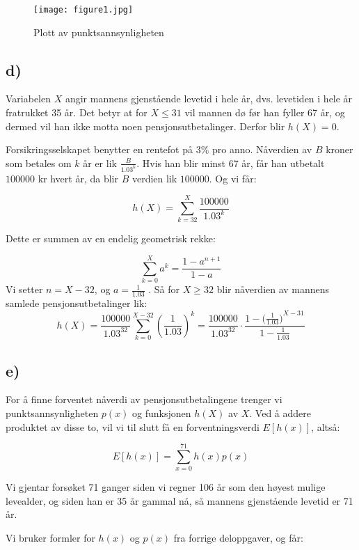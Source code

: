 \documentclass[a4paper, 12pt]{article}
\begin{document}
\begin{figure}[h]
    \centering
    \texttt{[image: figure1.jpg]}
    \caption{Plott av punktsannsynligheten}
    \label{fig:enter-label}
\end{figure}

\subsection*{d)}
\begin{FlushLeft}
Variabelen \(X\) angir mannens gjenstående levetid i hele år, dvs. levetiden i hele år fratrukket 35 år. Det betyr at for \(X \leq 31\) vil mannen dø før han fyller 67 år, og
dermed vil han ikke motta noen pensjonsutbetalinger. Derfor blir \(h(X)=0\).
\end{FlushLeft}
\begin{FlushLeft}
Forsikringsselskapet benytter en rentefot på \(3\%\) pro anno. Nåverdien av \(B\) kroner som betales om \(k\) år er lik \(\frac{B}{{1.03}^{k}}\). Hvis han blir minst 67 år, får han utbetalt \(100000\) kr hvert år, da blir \(B\) verdien lik \(100000\). Og vi får:
\end{FlushLeft}
\[
h(X) = \sum_{k=32}^{X} \frac{100000}{{1.03}^{k}}
\]
\begin{FlushLeft}
Dette er summen av en endelig geometrisk rekke:
\end{FlushLeft}
\[
\sum_{k=0}^{X} a^{k} = \frac{1-{a}^{n+1}}{1-a}
\]
Vi setter \(n=X-32\), og \(a= \frac{1}{1.03}\)
. Så for \(X \geq 32\) blir nåverdien av mannens samlede
pensjonsutbetalinger lik:
\[
h(X) = \frac{100000}{{1.03}^{32}} \sum_{k=0}^{X-32} (\frac{1}{1.03})^{k} = \frac{100000}{{1.03}^{32}} \cdot \frac{1-({\frac{1}{1.03})}^{X-31}}{1-{\frac{1}{1.03}}}
\]

\subsection*{e)}
\begin{FlushLeft}
For å finne forventet nåverdi av pensjonsutbetalingene trenger vi punktsannsynligheten \( p(x) \) og funksjonen \( h(X) \) av \( X \). Ved å addere produktet av disse to, vil vi til slutt få en forventningsverdi \( E[h(x)] \), altså:
\end{FlushLeft}
\[
E[h(x)] = \sum_{x=0}^{71} h(x)p(x)
\]
\begin{FlushLeft}
Vi gjentar forsøket 71 ganger siden vi regner 106 år som den høyest mulige levealder, og siden han er 35 år gammal nå, så mannens gjenstående levetid er 71 år.
\end{FlushLeft}
\begin{FlushLeft}
Vi bruker formler for \( h(x) \) og \( p(x) \) fra forrige deloppgaver, og får:
\end{FlushLeft}
\end{document}
